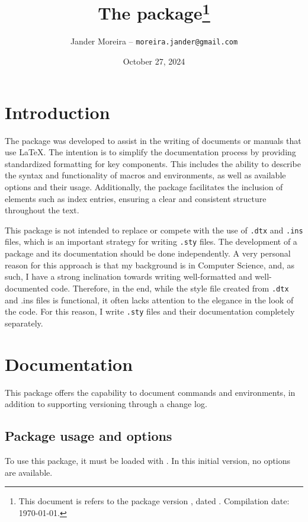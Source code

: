 \documentclass[11pt, outdir = ./out]{article}
\title{The \PackageName{docs} package\footnote{This document is refers to the package version \DocsVersion, dated \DocsDate. Compilation date: \today.}}
\author{Jander Moreira -- \texttt{moreira.jander@gmail.com}}
\date{October 27, 2024}
\begin{document}
\maketitle

\tableofcontents


\DocsPrintChanges


\section{Introduction}

%
The  package was developed to assist in the writing of documents or manuals that use \LaTeX. The intention is to simplify the documentation process by providing standardized formatting for key components. This includes the ability to describe the syntax and functionality of macros and environments, as well as available options and their usage. Additionally, the package facilitates the inclusion of elements such as index entries, ensuring a clear and consistent structure throughout the text.

This package is not intended to replace or compete with the use of \texttt{.dtx} and \texttt{.ins} files, which is an important strategy for writing \texttt{.sty} files. The development of a package and its documentation should be done independently. A very personal reason for this approach is that my background is in Computer Science, and, as such, I have a strong inclination towards writing well-formatted and well-documented code. Therefore, in the end, while the style file created from \texttt{.dtx} and .ins files is functional, it often lacks attention to the elegance in the look of the code. For this reason, I write \texttt{.sty} files and their documentation completely separately.


\section {Documentation}

This package offers the capability to document commands and environments, in addition to supporting versioning through a change log.

\subsection{Package usage and options}
To use this package, it must be loaded with . In this initial version, no options are available.
\end{document}
